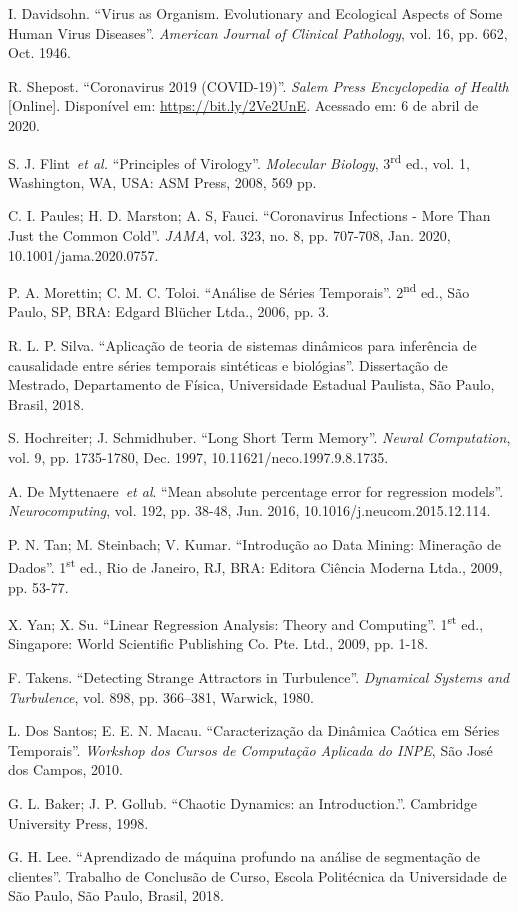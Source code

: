 \documentclass{ieeeaccess}
\begin{document}
\begin{thebibliography}{00}
	
 I. Davidsohn. ``Virus as Organism. Evolutionary and Ecological Aspects of Some Human Virus Diseases''. \emph{American Journal of Clinical Pathology}, vol. 16, pp. 662, Oct. 1946.

 R. Shepost. ``Coronavirus 2019 (COVID-19)''.  \emph{Salem Press Encyclopedia of Health} [Online]. Disponível em: 
\underline{https://bit.ly/2Ve2UnE}. Acessado em: 6 de abril de 2020.

 S. J. Flint~\emph{et al.} ``Principles of Virology''.  \emph{Molecular Biology}, 3\textsuperscript{rd} ed., vol. 1, Washington, WA, 
USA: ASM Press, 2008, 569 pp.

 C. I. Paules;  H. D. Marston; A. S, Fauci. ``Coronavirus Infections - More Than Just the Common Cold''. \emph{JAMA}, vol. 323, 
no. 8, pp. 707-708, Jan. 2020, 10.1001/jama.2020.0757.

 P. A. Morettin; C. M. C. Toloi. ``Análise de Séries Temporais''.  2\textsuperscript{nd} ed., 
São Paulo, SP, BRA: Edgard Blücher Ltda., 2006, pp. 3.

 R. L. P. Silva. ``Aplicação de teoria de sistemas dinâmicos para inferência de causalidade entre séries temporais sintéticas e biológias''. Dissertação de Mestrado, Departamento de Física, Universidade Estadual Paulista, São Paulo, Brasil, 2018.

 S. Hochreiter; J. Schmidhuber. ``Long Short Term Memory''. \emph{Neural Computation}, vol. 9,  pp. 1735-1780, Dec. 1997, 10.11621/neco.1997.9.8.1735.

 A. De Myttenaere~\emph{et al}. ``Mean absolute percentage error for regression models''. \emph{Neurocomputing}, vol. 192,  pp. 38-48, Jun. 2016, 10.1016/j.neucom.2015.12.114.

 P. N. Tan; M. Steinbach; V. Kumar. ``Introdução ao Data Mining: Mineração de Dados''.  1\textsuperscript{st} ed., 
Rio de Janeiro, RJ, BRA: Editora Ciência Moderna Ltda., 2009, pp. 53-77.

 X. Yan; X. Su. ``Linear Regression Analysis: Theory and Computing''.  1\textsuperscript{st} ed., 
Singapore: World Scientific Publishing Co. Pte. Ltd., 2009, pp. 1-18.

 F. Takens. ``Detecting Strange Attractors in Turbulence''. \emph{Dynamical Systems and Turbulence}, vol. 898, pp. 366–381, Warwick, 1980.

 L. Dos Santos; E. E. N. Macau. ``Caracterização da Dinâmica Caótica em Séries Temporais''. \emph{Workshop dos Cursos de Computação Aplicada do INPE}, São José dos Campos, 2010.

 G. L. Baker; J. P. Gollub. ``Chaotic Dynamics: an Introduction.''.  Cambridge University Press, 1998.

 G. H. Lee. ``Aprendizado de máquina profundo na análise de segmentação de clientes''. Trabalho de Conclusão de Curso,  Escola Politécnica da Universidade de São Paulo, São Paulo, Brasil, 2018.

\end{thebibliography}

\EOD
\end{document}
